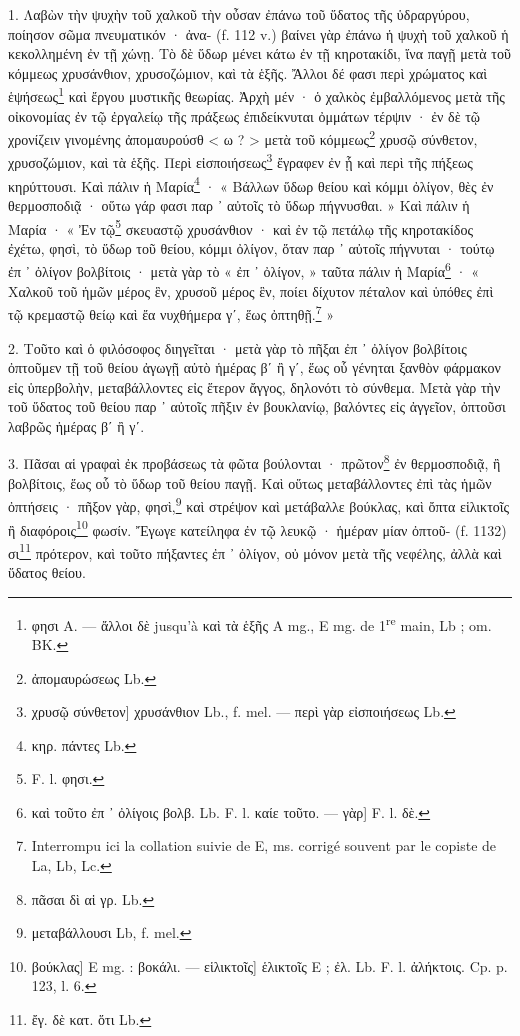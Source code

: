 \documentclass[a4paper, 11pt, oneside, polutonikogreek, french]{article}
\begin{document}
\bigskip

1. Λαβὼν τὴν ψυχὴν τοῦ χαλκοῦ τὴν οὖσαν ἐπάνω τοῦ ὕδατος τῆς ὑδραργύρου, ποίησον σῶμα πνευματικόν · ἀνα- (f. 112 v.) βαίνει γὰρ ἐπάνω ἡ ψυχὴ τοῦ χαλκοῦ ἡ κεκολλημένη ἐν τῇ χώνῃ. Τὸ δὲ ὕδωρ μένει κάτω ἐν τῇ κηροτακίδι, ἵνα παγῇ μετὰ τοῦ κόμμεως χρυσάνθιον, χρυσοζώμιον, καὶ τὰ ἑξῆς. Ἄλλοι δέ φασι περὶ χρώματος καὶ ἑψήσεως\footnote{φησι A. --- ἄλλοι δὲ jusqu'à καὶ τὰ ἑξῆς A mg., E mg. de 1\textsuperscript{re} main, Lb ; om. BK.} καὶ ἔργου μυστικῆς θεωρίας. Ἀρχὴ μέν · ὁ χαλκὸς ἐμβαλλόμενος μετὰ τῆς οἰκονομίας ἐν τῷ ἐργαλείῳ τῆς πράξεως ἐπιδείκνυται ὀμμάτων τέρψιν · ἐν δὲ τῷ χρονίζειν γινομένης ἀπομαυρούσθ < ω ? > μετὰ τοῦ κόμμεως\footnote{ἀπομαυρώσεως Lb.} χρυσῷ σύνθετον, χρυσοζώμιον, καὶ τὰ ἑξῆς. Περὶ εἰσποιήσεως\footnote{χρυσῷ σύνθετον] χρυσάνθιον Lb., f. mel. --- περὶ γὰρ εἰσποιήσεως Lb.} ἔγραφεν ἐν ᾗ καὶ περὶ τῆς πήξεως κηρύττουσι. Καὶ πάλιν ἡ Μαρία\footnote{κηρ. πάντες Lb.} · « Βάλλων ὕδωρ θείου καὶ κόμμι ὀλίγον, θὲς ἐν θερμοσποδιᾷ · οὕτω γάρ φασι παρ ᾽ αὐτοῖς τὸ ὕδωρ πήγνυσθαι. » Καὶ πάλιν ἡ Μαρία · « Ἐν τῷ\footnote{F. l. φησι.} σκευαστῷ χρυσάνθιον · καὶ ἐν τῷ πετάλῳ τῆς κηροτακίδος ἐχέτω, φησὶ, τὸ ὕδωρ τοῦ θείου, κόμμι ὀλίγον, ὅταν παρ ᾽ αὐτοῖς πήγνυται · τούτῳ ἐπ ᾽ ὀλίγον βολβίτοις · μετὰ γὰρ τὸ « ἐπ ᾽ ὀλίγον, » ταῦτα πάλιν ἡ Μαρία\footnote{καὶ τοῦτο ἐπ ᾽ ὀλίγοις βολβ. Lb. F. l. καίε τοῦτο. --- γὰρ] F. l. δὲ.} · « Χαλκοῦ τοῦ ἡμῶν μέρος ἓν, χρυσοῦ μέρος ἓν, ποίει δίχυτον πέταλον καὶ ὑπόθες ἐπὶ τῷ κρεμαστῷ θείῳ καὶ ἔα νυχθήμερα γʹ, ἕως ὀπτηθῇ.\footnote{Interrompu ici la collation suivie de E, ms. corrigé souvent par le copiste de La, Lb, Lc.} »

2. Τοῦτο καὶ ὁ φιλόσοφος διηγεῖται · μετὰ γὰρ τὸ πῆξαι ἐπ ᾽ ὀλίγον βολβίτοις ὀπτοῦμεν τῇ τοῦ θείου ἀγωγῇ αὐτὸ ἡμέρας βʹ ἢ γʹ, ἕως οὗ γένηται ξανθὸν φάρμακον εἰς ὑπερβολὴν, μεταβάλλοντες εἰς ἕτερον ἄγγος, δηλονότι τὸ σύνθεμα. Μετὰ γὰρ τὴν τοῦ ὕδατος τοῦ θείου παρ ᾽ αὐτοῖς πῆξιν ἐν βουκλανίῳ, βαλόντες εἰς ἀγγεῖον, ὀπτοῦσι λαβρῶς ἡμέρας βʹ ἢ γʹ.

3. Πᾶσαι αἱ γραφαὶ ἐκ προβάσεως τὰ φῶτα βούλονται · πρῶτον\footnote{πᾶσαι δὶ αἱ γρ. Lb.} ἐν θερμοσποδιᾷ, ἢ βολβίτοις, ἕως οὗ τὸ ὕδωρ τοῦ θείου παγῇ. Καὶ οὕτως μεταβάλλοντες ἐπὶ τὰς ἡμῶν ὀπτήσεις · πῆξον γὰρ, φησὶ,\footnote{μεταβάλλουσι Lb, f. mel.} καὶ στρέψον καὶ μετάβαλλε βούκλας, καὶ ὄπτα εἱλικτοῖς ἢ διαφόροις\footnote{βούκλας] E mg. : βοκάλι. --- εἱλικτοῖς] ἑλικτοῖς E ; ἐλ. Lb. F. l. ἀλήκτοις. Cp. p. 123, l. 6.} φωσίν. Ἔγωγε κατείληφα ἐν τῷ λευκῷ · ἡμέραν μίαν ὀπτοῦ- (f. 1132) σι\footnote{ἔγ. δὲ κατ. ὅτι Lb.} πρότερον, καὶ τοῦτο πήξαντες ἐπ ᾽ ὀλίγον, οὐ μόνον μετὰ τῆς νεφέλης, ἀλλὰ καὶ ὕδατος θείου.
\end{document}
